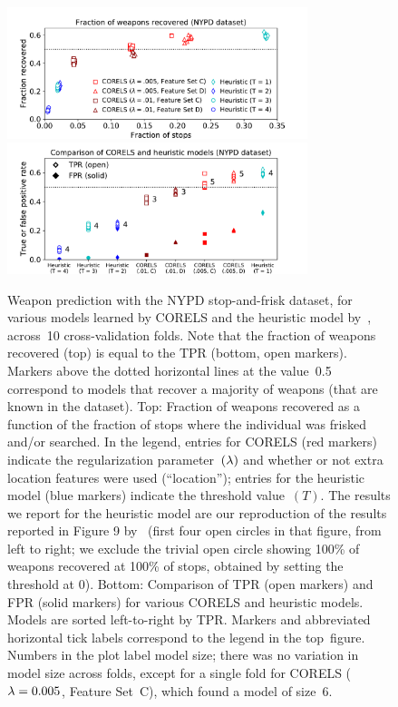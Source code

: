 \begin{figure}[t!]
\begin{center}
\includegraphics[trim={12mm, 0mm, 24mm, 5mm},
width=0.78\textwidth]{figs/cpw_folds.pdf}
\includegraphics[trim={12mm, 5mm, 24mm, 0mm},
width=0.78\textwidth]{figs/cpw_tpr_fpr.pdf}
\end{center}
\caption{Weapon prediction with the NYPD stop-and-frisk dataset,
for various models learned by CORELS and the heuristic model by~\citet{Goel16},
across~10 cross-validation folds.
%
Note that the fraction of weapons recovered (top) is equal to the TPR (bottom, open markers).
%
Markers above the dotted horizontal lines at the value~0.5 correspond to models that
recover a majority of weapons (that are known in the dataset).
%
Top: Fraction of weapons recovered as a function of the fraction of stops
where the individual was frisked and/or searched.
%
In the legend, entries for CORELS (red markers) indicate the regularization parameter~$({\lambda})$
and whether or not extra location features were used (``location'');
entries for the heuristic model (blue markers) indicate the threshold value~$(T)$.
%
The results we report for the heuristic model
are our reproduction of the results reported in Figure 9 by~\citet{Goel16}
(first four open circles in that figure, from left to right; we exclude the trivial open circle
showing 100\% of weapons recovered at 100\% of stops, obtained by setting the threshold at 0).
%
Bottom: Comparison of TPR (open markers) and FPR (solid markers) for various
CORELS and heuristic models.
%
Models are sorted left-to-right by TPR.
%
Markers and abbreviated horizontal tick labels correspond to the legend in the top~figure.
%
Numbers in the plot label model size; there was no variation in model size across folds,
except for a single fold for CORELS (${{\lambda} = 0.005}$, Feature Set~C), which found a model of size~6.
}
\label{fig:frisk}
\end{figure}

